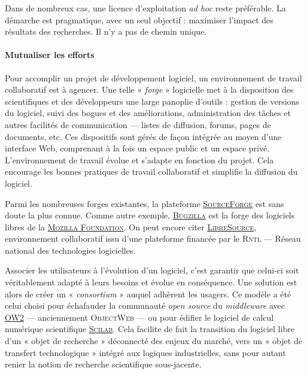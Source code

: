 Dans de nombreux cas, une licence d'exploitation \textit{ad hoc} reste pré\-férable. La démarche est pragmatique, avec un seul objectif : maximiser l'impact des résultats des recherches. Il n'y a pas de chemin unique.

\paragraph{Mutualiser les efforts}

Pour accomplir un projet de déve\-loppement logiciel, un environnement de travail collaboratif est à agen\-cer. Une telle « \emph{forge} » logicielle met à la disposition des scientifiques et des développeurs une large panoplie d'outils : gestion de versions du logiciel, suivi des bogues et des améliorations, administration des tâches et autres facilités de communication --- listes de diffusion, forums, pages de documents, etc. Ces dispositifs sont gérés de façon intégrée au moyen d'une interface Web, comprenant à la fois un espace public et un espace privé. L'environnement de travail évolue et s'adapte en fonction du projet. Cela encourage les bonnes pratiques de travail collaboratif et simplifie la diffusion du logiciel.

Parmi les nombreuses forges existantes, la plateforme \href{https://sourceforge.net/}{\textsc{SourceForge}} est sans doute la plus connue. Comme autre exemple, \href{https://bugzilla.mozilla.org/home}{\textsc{Bugzilla}} est la forge des logiciels libres de la \href{https://www.mozilla.org/fr/}{\textsc{Mozilla Foundation}}. On peut encore citer \href{http://dev.libresource.org/}{\textsc{LibreSource}}, environnement collaboratif issu d'une plateforme financée par le \textsc{Rntl} --- Réseau national des technologies logicielles.

Associer les utilisateurs à l'évolution d'un logiciel, c'est garantir que celui-ci soit véritablement adapté à leurs besoins et évolue en conséquence. Une solution est alors de créer un « \emph{consortium} » auquel adhè\-rent les usagers. Ce modèle a été celui choisi pour échafauder la communauté \textit{open source} du \textit{middleware} avec \href{https://www.ow2.org/}{OW2} --- anciennement \textsc{ObjectWeb} --- ou pour édifier le logiciel de calcul numérique scientifique \href{https://www.scilab.org/}{\textsc{Scilab}}. Cela facilite de fait la transition du logiciel libre d'un « objet de recherche » déconnecté des enjeux du marché, vers un « objet de transfert technologique » intégré aux logiques industrielles, sans pour autant renier la notion de recherche scientifique sous-jacente. 

